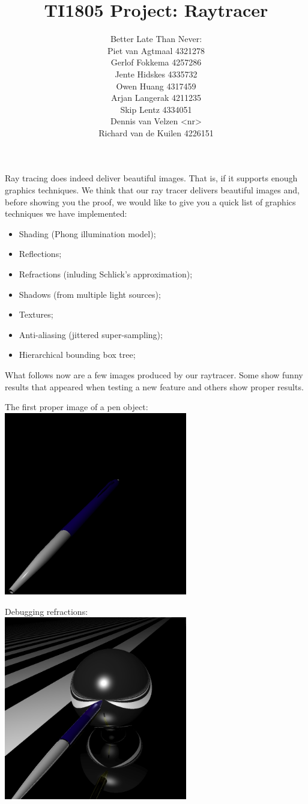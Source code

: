 \documentclass[a4paper,11pt]{article}
\title{TI1805 Project: Raytracer}
\author{Better Late Than Never:\\
		Piet van Agtmaal 4321278\\
		Gerlof Fokkema 4257286\\
		Jente Hidskes 4335732\\
		Owen Huang 4317459\\
		Arjan Langerak 4211235\\
		Skip Lentz 4334051\\
		Dennis van Velzen <nr>\\
		Richard van de Kuilen 4226151\\
	   }
\begin{document}
\maketitle
Ray tracing does indeed deliver beautiful images. That is, if it supports enough graphics techniques. We think that our ray tracer delivers beautiful images and, before showing you the proof, we would like to give you a quick list of graphics techniques we have implemented:
\begin{itemize}
	\item Shading (Phong illumination model);
	\item Reflections;
	\item Refractions (inluding Schlick's approximation);
	\item Shadows (from multiple light sources);
	\item Textures;
	\item Anti-aliasing (jittered super-sampling);
	\item Hierarchical bounding box tree;
\end{itemize}
What follows now are a few images produced by our raytracer. Some show funny results that appeared when testing a new feature and others show proper results.

\newpage The first proper image of a pen object:\\
\includegraphics[keepaspectratio,width=8.0cm]{images/interpolate_pen}

Debugging refractions:\\
\includegraphics[keepaspectratio,width=8.0cm]{images/master-plane-sphere-pen}\\
\end{document}
